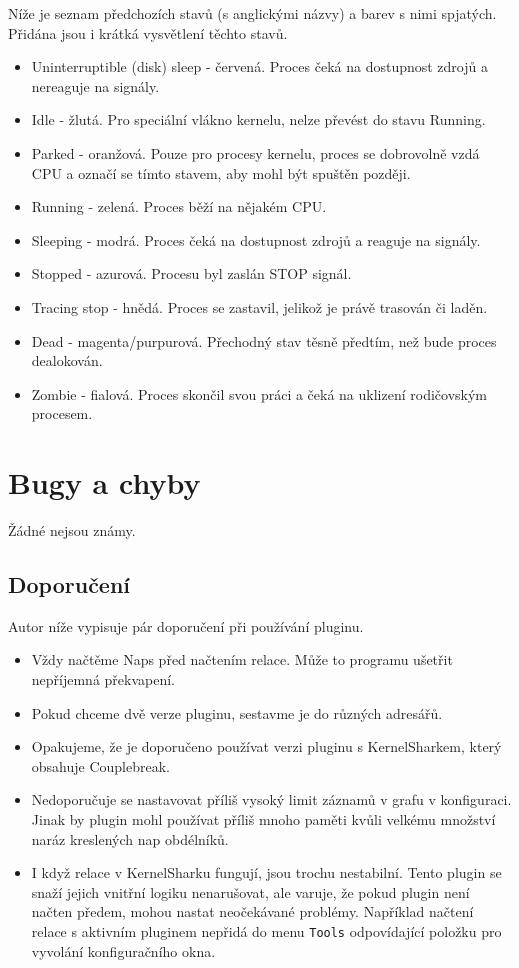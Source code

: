 Níže je seznam předchozích stavů (s anglickými názvy) a barev s nimi spjatých. Přidána jsou i krátká vysvětlení těchto stavů.
\begin{itemize}
  \item Uninterruptible (disk) sleep - červená. Proces čeká na dostupnost zdrojů a nereaguje na signály.
  \item Idle - žlutá. Pro speciální vlákno kernelu, nelze převést do stavu Running.
  \item Parked - oranžová. Pouze pro procesy kernelu, proces se dobrovolně vzdá CPU a označí se tímto stavem, aby mohl být spuštěn později. 
  \item Running - zelená. Proces běží na nějakém CPU.
  \item Sleeping - modrá. Proces čeká na dostupnost zdrojů a reaguje na signály.
  \item Stopped - azurová. Procesu byl zaslán STOP signál.
  \item Tracing stop - hnědá. Proces se zastavil, jelikož je právě trasován či laděn.
  \item Dead - magenta/purpurová. Přechodný stav těsně předtím, než bude proces dealokován.
  \item Zombie - fialová. Proces skončil svou práci a čeká na uklizení rodičovským procesem.
\end{itemize}

\section{Bugy a chyby}

Žádné nejsou známy.

\subsection{Doporučení}

Autor níže vypisuje pár doporučení při používání pluginu.
\begin{itemize}
  \item Vždy načtěme Naps před načtením relace. Může to programu ušetřit nepříjemná překvapení.
  \item Pokud chceme dvě verze pluginu, sestavme je do různých adresářů.
  \item Opakujeme, že je doporučeno používat verzi pluginu s KernelSharkem, který obsahuje Couplebreak.
  \item Nedoporučuje se nastavovat příliš vysoký limit záznamů v grafu v konfiguraci. Jinak by plugin mohl používat příliš mnoho paměti kvůli velkému množství naráz kreslených nap obdélníků.
  \item I když relace v KernelSharku fungují, jsou trochu nestabilní. Tento plugin se snaží jejich vnitřní logiku nenarušovat, ale varuje, že pokud plugin není načten předem, mohou nastat neočekávané problémy. Například načtení relace s aktivním pluginem nepřidá do menu \texttt{Tools} odpovídající položku pro vyvolání konfiguračního okna.
\end{itemize}

